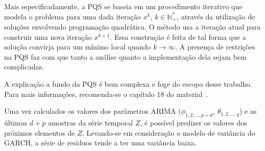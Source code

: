 Mais especificadamente, a PQS se baseia em um procedimento iterativo que modela
o problema para uma dada iteração $x^k$, $k \in \mathbb{N}_+^*$, através da
utilização de soluções envolvendo programação quadrática. O método usa a
iteração atual para construir uma nova iteração $x^{k+1}$. Essa construção é
feita de tal forma que a solução convirja para um mínimo local quando $k
\rightarrow \infty$. A presença de restrições na PQS faz com que tanto a
análise quanto a implementação dela sejam bem complicadas.

A explicação a fundo da PQS é bem complexa e foge do escopo desse trabalho.
Para mais informações, recomenda-se o capítulo
18 do material~\citep{LIVRO:Optimization}.

Uma vez calculados os valores dos parâmetros ARIMA ($\phi_{1, 2, \hdots, p+d}$,
$\theta_{1, 2, \hdots, q}$) e as últimas $d+p$ amostras da série temporal $Z$, é
possível predizer os valores dos próximos elementos de $Z$. Levando-se em
consideração o modelo de variância do GARCH, a série de resíduos tende a ter uma
variância baixa.
